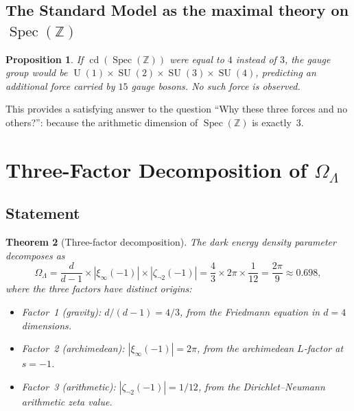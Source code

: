 \documentclass[12pt,a4paper]{article}
\newtheorem{theorem}{Theorem}[section]
\newtheorem{proposition}[theorem]{Proposition}
\theoremstyle{definition}
\newcommand{\Spec}{\operatorname{Spec}}
\newcommand{\SU}{\operatorname{SU}}
\newcommand{\cd}{\operatorname{cd}}
\newcommand{\Z}{\mathbb{Z}}
\newcommand{\OmL}{\Omega_\Lambda}
\newcommand{\U}{\operatorname{U}}
\begin{document}
\subsection{The Standard Model as the maximal theory on $\Spec(\Z)$}

\begin{proposition}
If $\cd(\Spec(\Z))$ were equal to $4$ instead of $3$, the gauge group
would be $\U(1)\times\SU(2)\times\SU(3)\times\SU(4)$, predicting an
additional force carried by $15$ gauge bosons.
No such force is observed.
\end{proposition}

This provides a satisfying answer to the question ``Why these three
forces and no others?'': because the arithmetic dimension of
$\Spec(\Z)$ is exactly~$3$.

\section{Three-Factor Decomposition of $\OmL$}\label{sec:three_factor}

\subsection{Statement}

\begin{theorem}[Three-factor decomposition]\label{thm:three_factor}
The dark energy density parameter decomposes as
\begin{equation}\label{eq:three_factor}
  \OmL = \frac{d}{d-1}\times|\xi_\infty(-1)|\times|\zeta_{\neg 2}(-1)|
       = \frac{4}{3}\times 2\pi \times \frac{1}{12}
       = \frac{2\pi}{9}
       \approx 0.698,
\end{equation}
where the three factors have distinct origins:
\begin{itemize}
  \item Factor~1 (gravity): $d/(d-1) = 4/3$, from the Friedmann equation
    in $d=4$ dimensions.
  \item Factor~2 (archimedean): $|\xi_\infty(-1)| = 2\pi$, from the
    archimedean $L$-factor at $s=-1$.
  \item Factor~3 (arithmetic): $|\zeta_{\neg 2}(-1)| = 1/12$, from the
    Dirichlet--Neumann arithmetic zeta value.
\end{itemize}
\end{theorem}
\end{document}
